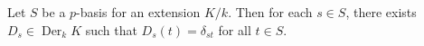 Let $S$ be a $p$-basis for an extension $K/k$. Then for each $s \in S$, there exists $D_s \in \operatorname{Der}_k K$ such that $D_s(t) = \delta_{st}$ for all $t \in S$.
